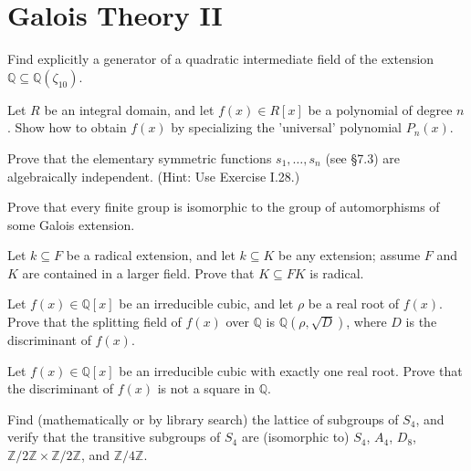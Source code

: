 \documentclass[openany]{book}
\begin{document}
\section{Galois Theory II}

\begin{prob}
    Find explicitly a generator of a quadratic intermediate field of the extension $\mathbb{Q} \subseteq \mathbb{Q}(\zeta_{10})$.
    \end{prob}
    
\begin{prob}
    Let $R$ be an integral domain, and let $f(x) \in R[x]$ be a polynomial of degree $n$. Show how to obtain $f(x)$ by specializing the 'universal' polynomial $P_n(x)$.
\end{prob}





\begin{prob}
Prove that the elementary symmetric functions \( s_1, \ldots, s_n \) (see \S7.3) are algebraically independent. (Hint: Use Exercise I.28.)
\end{prob}

\begin{prob}
Prove that every finite group is isomorphic to the group of automorphisms of some Galois extension.
\end{prob}

\begin{prob}
Let \( k \subseteq F \) be a radical extension, and let \( k \subseteq K \) be any extension; assume \( F \) and \( K \) are contained in a larger field. Prove that \( K \subseteq FK \) is radical.
\end{prob}

\begin{prob}
Let \( f(x) \in \mathbb{Q}[x] \) be an irreducible cubic, and let \( \rho \) be a real root of \( f(x) \). Prove that the splitting field of \( f(x) \) over \( \mathbb{Q} \) is \( \mathbb{Q}(\rho, \sqrt{D}) \), where \( D \) is the discriminant of \( f(x) \).
\end{prob}

\begin{prob}
Let \( f(x) \in \mathbb{Q}[x] \) be an irreducible cubic with exactly one real root. Prove that the discriminant of \( f(x) \) is not a square in \( \mathbb{Q} \).
\end{prob}

\begin{prob}
Find (mathematically or by library search) the lattice of subgroups of \( S_4 \), and verify that the transitive subgroups of \( S_4 \) are (isomorphic to) \( S_4 \), \( A_4 \), \( D_8 \), \( \mathbb{Z}/2\mathbb{Z} \times \mathbb{Z}/2\mathbb{Z} \), and \( \mathbb{Z}/4\mathbb{Z} \).
\end{prob}
\end{document}
